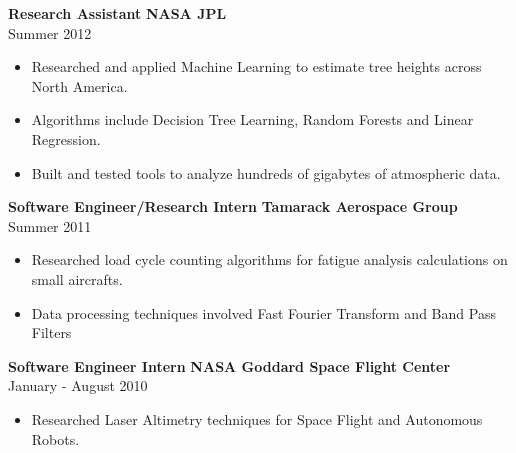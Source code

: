 \documentclass[9pt]{article}
\newenvironment{changemargin}[2]{%
  \begin{list}{}{%
    \setlength{\topsep}{0pt}%
    \setlength{\leftmargin}{#1}%
    \setlength{\rightmargin}{#2}%
    \setlength{\listparindent}{\parindent}%
    \setlength{\itemindent}{\parindent}%
    \setlength{\parsep}{\parskip}%
  }%
  \item[]}{\end{list}
}
\newenvironment{body} {
    \vspace*{-16pt}
    \begin{changemargin}{-0.20in}{-0.5in}
  }
    {\end{changemargin}
}
\begin{document}
\begin{body}
    \textbf{Research Assistant}
    \hfill
    \textbf{NASA JPL}\\
    \hfill
    {\small Summer 2012}
    \vspace*{-14pt}
    \begin{itemize} %
        \item Researched and applied Machine Learning to estimate tree heights across North America.
        \item Algorithms include Decision Tree Learning, Random Forests and Linear Regression.
        \item Built and tested tools to analyze hundreds of gigabytes of atmospheric data.
    \end{itemize}

    \textbf{Software Engineer/Research Intern}
    \hfill
    \textbf{Tamarack Aerospace Group}\\
    \hfill
    {\small Summer 2011}

    \vspace*{-14pt}
    \begin{itemize} %
        \item Researched load cycle counting algorithms for fatigue analysis calculations on small aircrafts.
        \item Data processing techniques involved Fast Fourier Transform and Band Pass Filters
    \end{itemize}

    \textbf{Software Engineer Intern}
    \hfill
    \textbf{NASA Goddard Space Flight Center}\\
    \hfill
    {\small January - August 2010}

    \vspace*{-14pt}
    \begin{itemize} %
        \item Researched Laser Altimetry techniques for Space Flight and Autonomous Robots.
    \end{itemize}


\end{body}
\end{document}
